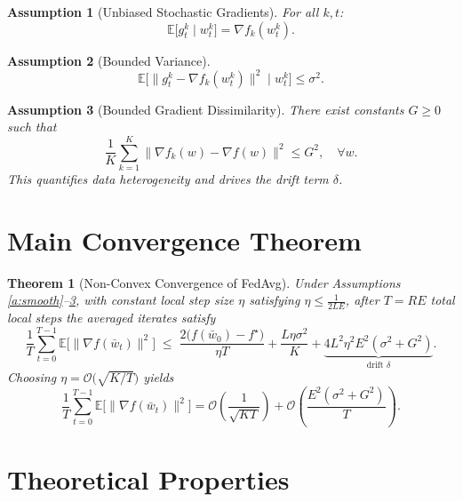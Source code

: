 \documentclass[11pt]{article}
\newtheorem{theorem}{Theorem}
\newtheorem{assumption}{Assumption}
\begin{document}
\begin{assumption}[Unbiased Stochastic Gradients]\label{a:unbias}
For all $k,t$:
\[
\mathbb{E}\big[g_t^k \mid w_t^k\big] = \nabla f_k(w_t^k).
\]
\end{assumption}

\begin{assumption}[Bounded Variance]\label{a:var}
\[
\mathbb{E}\big[\|g_t^k - \nabla f_k(w_t^k)\|^2 \mid w_t^k\big] \le \sigma^2.
\]
\end{assumption}

\begin{assumption}[Bounded Gradient Dissimilarity]\label{a:diss}
There exist constants $G \ge 0$ such that
\[
\frac{1}{K}\sum_{k=1}^K \|\nabla f_k(w) - \nabla f(w)\|^2 \le G^2,
\quad \forall w.
\]
This quantifies data heterogeneity and drives the drift term $\delta$.
\end{assumption}

\section*{Main Convergence Theorem}

\begin{theorem}[Non-Convex Convergence of FedAvg]\label{thm:main}
Under Assumptions \ref{a:smooth}--\ref{a:diss}, with constant local step size
$\eta$ satisfying $\eta \le \frac{1}{2L E}$, after $T = RE$ total local steps
the averaged iterates satisfy
\[
\frac{1}{T}\sum_{t=0}^{T-1}
\mathbb{E}\big[\|\nabla f(\bar w_t)\|^2\big]
\;\le\;
\frac{2\big(f(\bar w_0) - f^\star\big)}{\eta T}
+ \frac{L\eta \sigma^2}{K}
+ \underbrace{4 L^2 \eta^2 E^2 (\sigma^2 + G^2)}_{\text{drift } \delta}.
\]
Choosing $\eta = \mathcal{O}\!\big(\sqrt{K/T}\big)$ yields
\[
\frac{1}{T}\sum_{t=0}^{T-1}
\mathbb{E}\big[\|\nabla f(\bar w_t)\|^2\big]
= \mathcal{O}\!\left(\frac{1}{\sqrt{KT}}\right)
+ \mathcal{O}\!\left(\frac{E^2 (\sigma^2+G^2)}{T}\right).
\]
\end{theorem}

\section*{Theoretical Properties}
\end{document}
